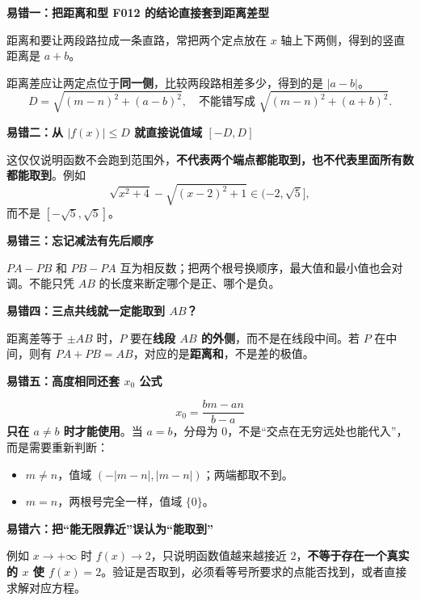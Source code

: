 \clearpage
\begin{trapbox}
\textbf{\textcolor{CTrap}{易错一：把距离和型 F012 的结论直接套到距离差型}}



距离和要让两段路拉成一条直路，常把两个定点放在 $x$ 轴上下两侧，得到的竖直距离是 $a+b$。

距离差应让两定点位于\textbf{同一侧}，比较两段路相差多少，得到的是 $|a-b|$。
\[
 \boxed{D=\sqrt{(m-n)^2+(a-b)^2}},
 \quad\text{不能错写成 }\sqrt{(m-n)^2+(a+b)^2}.
\]

\end{trapbox}
\clearpage
\begin{trapbox}
\textbf{\textcolor{CTrap}{易错二：从 $|f(x)|\leq D$ 就直接说值域 $[-D,D]$}}



这仅仅说明函数不会跑到范围外，\textbf{不代表两个端点都能取到，也不代表里面所有数都能取到}。例如
\[
 \sqrt{x^2+4}-\sqrt{(x-2)^2+1}
 \in(-2,\sqrt5],
\]
而不是 $[-\sqrt5,\sqrt5]$。

\textbf{\textcolor{CTrap}{易错三：忘记减法有先后顺序}}

$PA-PB$ 和 $PB-PA$ 互为相反数；把两个根号换顺序，最大值和最小值也会对调。不能只凭 $AB$ 的长度来断定哪个是正、哪个是负。

\textbf{\textcolor{CTrap}{易错四：三点共线就一定能取到 $AB$？}}

距离差等于 $\pm AB$ 时，$P$ 要在\textbf{线段 $AB$ 的外侧}，而不是在线段中间。若 $P$ 在中间，则有 $PA+PB=AB$，对应的是\textbf{距离和}，不是差的极值。
\end{trapbox}
\clearpage
\begin{trapbox}
\textbf{\textcolor{CTrap}{易错五：高度相同还套 $x_0$ 公式}}



\[
 x_0=\frac{bm-an}{b-a}
\]
\textbf{只在 $a\ne b$ 时才能使用}。当 $a=b$，分母为 $0$，不是“交点在无穷远处也能代入”，而是需要重新判断：
\begin{itemize}[leftmargin=*,itemsep=.25em]
\item $m\ne n$，值域 $(-|m-n|,|m-n|)$；两端都取不到。
\item $m=n$，两根号完全一样，值域 $\{0\}$。
\end{itemize}

\textbf{\textcolor{CTrap}{易错六：把“能无限靠近”误认为“能取到”}}

例如 $x\to+\infty$ 时 $f(x)\to2$，只说明函数值越来越接近 $2$，\textbf{不等于存在一个真实的 $x$ 使 $f(x)=2$}。验证是否取到，必须看等号所要求的点能否找到，或者直接求解对应方程。

\end{trapbox}

